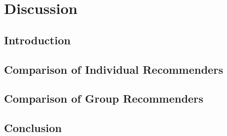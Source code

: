 
\chapter{Discussion}\label{chapter:discussion}

\section{Introduction}

\section{Comparison of Individual Recommenders}

\section{Comparison of Group Recommenders}



\section{Conclusion}
